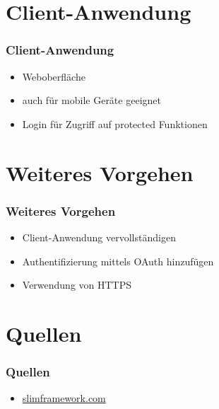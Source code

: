\section{Client-Anwendung}
\begin{frame}
	\frametitle*{Client-Anwendung}
	\begin{itemize}
		\item Weboberfläche
		\item auch für mobile Geräte geeignet
		\item Login für Zugriff auf protected Funktionen
	\end{itemize}
\end{frame}

\section{Weiteres Vorgehen}
\begin{frame}
	\frametitle*{Weiteres Vorgehen}
	\begin{itemize}
		\item Client-Anwendung vervollständigen
		\item Authentifizierung mittels OAuth hinzufügen
		\item Verwendung von HTTPS
	\end{itemize}
\end{frame}

\section{Quellen}
\begin{frame}
	\frametitle*{Quellen}
	\begin{itemize}
		\item \url{slimframework.com}
	\end{itemize}
\end{frame}
